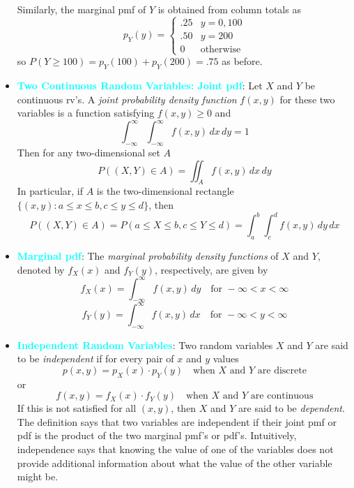 \documentclass{report}
\begin{document}
\begin{itemize}
\[            \]
            Similarly, the marginal pmf of \( Y \) is obtained from column totals as
            \[
                p_Y(y) = 
                \begin{cases}
                    .25 & y = 0, 100 \\
                    .50 & y = 200 \\
                    0 & \text{otherwise}
                \end{cases}
            \]
            so \( P(Y \ge 100) = p_Y(100) + p_Y(200) = .75 \) as before.
        \item \textbf{\textcolor{cyan}{Two Continuous Random Variables: Joint pdf}}:
            Let \( X \) and \( Y \) be continuous rv’s. A \textit{joint probability density function} \( f(x, y) \) for these two variables is a function satisfying \( f(x, y) \geq 0 \) and
            \[
                \int_{-\infty}^{\infty} \int_{-\infty}^{\infty} f(x, y) \, dx \, dy = 1
            \]
            Then for any two-dimensional set \( A \)
            \[
                P((X, Y) \in A) = \iint_A f(x, y) \, dx \, dy
            \]
            In particular, if \( A \) is the two-dimensional rectangle \(\{(x, y): a \leq x \leq b, c \leq y \leq d\}\), then
            \[
                P((X, Y) \in A) = P(a \leq X \leq b, c \leq Y \leq d) = \int_a^b \int_c^d f(x, y) \, dy \, dx
            \]
        \item \textbf{\textcolor{cyan}{Marginal pdf}}:
            The \textit{marginal probability density functions} of \(X\) and \(Y\), denoted by \(f_X(x)\) and \(f_Y(y)\), respectively, are given by
            \[
                f_X(x) = \int_{-\infty}^{\infty} f(x, y) \, dy \quad \text{for } -\infty < x < \infty
            \]
            \[
                f_Y(y) = \int_{-\infty}^{\infty} f(x, y) \, dx \quad \text{for } -\infty < y < \infty
            \]
        \item \textbf{\textcolor{cyan}{Independent Random Variables}}:
            Two random variables \( X \) and \( Y \) are said to be \textit{independent} if for every pair of \( x \) and \( y \) values
            \[
                p(x, y) = p_X(x) \cdot p_Y(y) \quad \text{when } X \text{ and } Y \text{ are discrete}
            \]
            or
            \[
                f(x, y) = f_X(x) \cdot f_Y(y) \quad \text{when } X \text{ and } Y \text{ are continuous}
            \]
            If this is not satisfied for all \((x, y)\), then \( X \) and \( Y \) are said to be \textit{dependent}.
            \bigbreak \noindent 
            The definition says that two variables are independent if their joint pmf or pdf is the
            product of the two marginal pmf’s or pdf’s. Intuitively, independence says that
            knowing the value of one of the variables does not provide additional information
            about what the value of the other variable might be.


\end{itemize}
\end{document}
